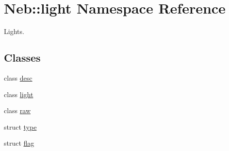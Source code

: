 \hypertarget{namespaceNeb_1_1light}{\section{\-Neb\-:\-:light \-Namespace \-Reference}
\label{namespaceNeb_1_1light}
}


\-Lights.  


\subsection*{\-Classes}
\begin{DoxyCompactItemize}
\item 
class \hyperlink{classNeb_1_1light_1_1desc}{desc}
\item 
class \hyperlink{classNeb_1_1light_1_1light}{light}
\item 
class \hyperlink{classNeb_1_1light_1_1raw}{raw}
\item 
struct \hyperlink{structNeb_1_1light_1_1type}{type}
\item 
struct \hyperlink{structNeb_1_1light_1_1flag}{flag}
\end{DoxyCompactItemize}
